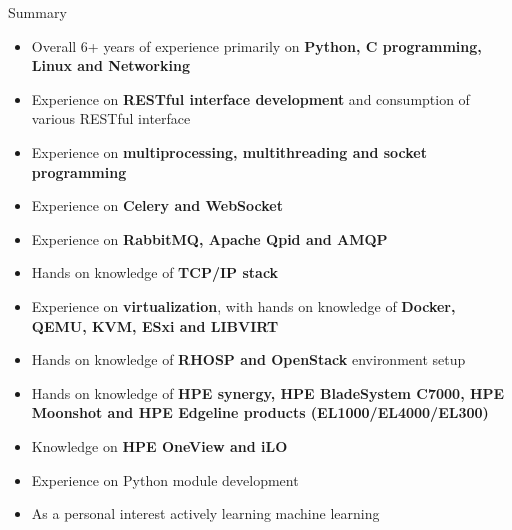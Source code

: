 \documentclass{resume} %
\begin{document}
  



\begin{rSection}{Summary}
\begin{itemize}
\setlength\itemsep{-1pt}
\item Overall 6+ years of experience primarily on \textbf{Python, C programming, Linux and Networking}
\item Experience on \textbf{RESTful interface development} and consumption of various RESTful interface
\item Experience on \textbf{multiprocessing, multithreading and socket programming}
\item Experience on \textbf{Celery and WebSocket}
\item Experience on \textbf{RabbitMQ, Apache Qpid and AMQP}
\item Hands on knowledge of \textbf{TCP/IP stack}
\item Experience on \textbf{virtualization}, with hands on knowledge of \textbf{Docker, QEMU, KVM, ESxi and LIBVIRT}
\item Hands on knowledge of \textbf{RHOSP and OpenStack} environment setup
\item Hands on knowledge of \textbf{HPE synergy, HPE BladeSystem C7000, HPE Moonshot and HPE Edgeline products (EL1000/EL4000/EL300)}
\item Knowledge on \textbf{HPE OneView and iLO}
\item Experience on Python module development
\item As a personal interest actively learning machine learning
\end{itemize}



\end{rSection}

\end{document}
